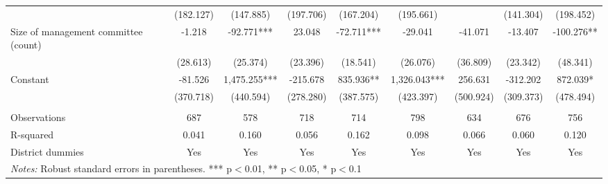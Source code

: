 \documentclass[11pt]{article}
\begin{document}
\begin{landscape}
\begin{table}[H]
{\begin{tabularx}{1.8\linewidth}{lcccccccc}
 & (182.127) & (147.885) & (197.706) & (167.204) & (195.661) &  & (141.304) & (198.452) \\
Size of management committee (count) & -1.218 & -92.771*** & 23.048 & -72.711*** & -29.041 & -41.071 & -13.407 & -100.276** \\
 & (28.613) & (25.374) & (23.396) & (18.541) & (26.076) & (36.809) & (23.342) & (48.341) \\
Constant & -81.526 & 1,475.255*** & -215.678 & 835.936** & 1,326.043*** & 256.631 & -312.202 & 872.039* \\
 & (370.718) & (440.594) & (278.280) & (387.575) & (423.397) & (500.924) & (309.373) & (478.494) \\
 &  &  &  &  &  &  &  &  \\
Observations & 687 & 578 & 718 & 714 & 798 & 634 & 676 & 756 \\
R-squared & 0.041 & 0.160 & 0.056 & 0.162 & 0.098 & 0.066 & 0.060 & 0.120 \\
 District dummies & Yes & Yes & Yes & Yes & Yes & Yes & Yes & Yes \\ \hline
\multicolumn{9}{l}{\textit{Notes:} Robust standard errors in parentheses. *** p$<$0.01, ** p$<$0.05, * p$<$0.1} \\
  \end{tabularx}}
\end{table}
\doublespacing

\end{landscape}

\newpage

\end{document}
